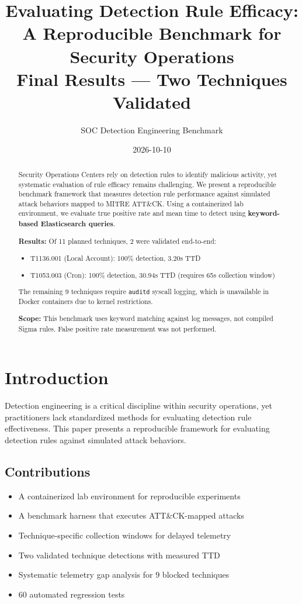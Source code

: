 \documentclass[11pt,a4paper]{article}
\title{Evaluating Detection Rule Efficacy: A Reproducible Benchmark for Security Operations\\
\large{Final Results --- Two Techniques Validated}}
\author{SOC Detection Engineering Benchmark}
\date{2026-10-10}
\begin{document}
\maketitle

\begin{abstract}
Security Operations Centers rely on detection rules to identify malicious activity, yet systematic evaluation of rule efficacy remains challenging. We present a reproducible benchmark framework that measures detection rule performance against simulated attack behaviors mapped to MITRE ATT\&CK. Using a containerized lab environment, we evaluate true positive rate and mean time to detect using \textbf{keyword-based Elasticsearch queries}.

\textbf{Results:} Of 11 planned techniques, 2 were validated end-to-end:
\begin{itemize}
    \item T1136.001 (Local Account): 100\% detection, 3.20s TTD
    \item T1053.003 (Cron): 100\% detection, 30.94s TTD (requires 65s collection window)
\end{itemize}

The remaining 9 techniques require \texttt{auditd} syscall logging, which is unavailable in Docker containers due to kernel restrictions.

\textbf{Scope:} This benchmark uses keyword matching against log messages, not compiled Sigma rules. False positive rate measurement was not performed.
\end{abstract}

\section{Introduction}

Detection engineering is a critical discipline within security operations, yet practitioners lack standardized methods for evaluating detection rule effectiveness. This paper presents a reproducible framework for evaluating detection rules against simulated attack behaviors.

\subsection{Contributions}

\begin{itemize}
    \item A containerized lab environment for reproducible experiments
    \item A benchmark harness that executes ATT\&CK-mapped attacks
    \item Technique-specific collection windows for delayed telemetry
    \item Two validated technique detections with measured TTD
    \item Systematic telemetry gap analysis for 9 blocked techniques
    \item 60 automated regression tests
\end{itemize}
\end{document}
